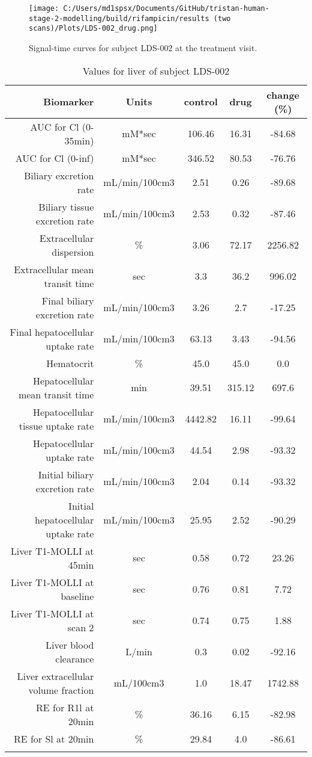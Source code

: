 \documentclass{epflreport}%
\begin{document}
%


\begin{figure}[h!]%
\centering%
\texttt{[image: C:/Users/md1spsx/Documents/GitHub/tristan-human-stage-2-modelling/build/rifampicin/results (two scans)/Plots/LDS-002\_drug.png]}%
\caption{Signal{-}time curves for subject LDS{-}002 at the treatment visit.}%
\end{figure}

%
\clearpage%
\begin{longtable}{rcccc}%
\hline%
Biomarker&Units&control&drug&change (\%)\\%
\hline%
AUC for Cl (0{-}35min)&mM*sec&106.46&16.31&{-}84.68\\%
AUC for Cl (0{-}inf)&mM*sec&346.52&80.53&{-}76.76\\%
Biliary excretion rate&mL/min/100cm3&2.51&0.26&{-}89.68\\%
Biliary tissue excretion rate&mL/min/100cm3&2.53&0.32&{-}87.46\\%
Extracellular dispersion&\%&3.06&72.17&2256.82\\%
Extracellular mean transit time&sec&3.3&36.2&996.02\\%
Final biliary excretion rate&mL/min/100cm3&3.26&2.7&{-}17.25\\%
Final hepatocellular uptake rate&mL/min/100cm3&63.13&3.43&{-}94.56\\%
Hematocrit&\%&45.0&45.0&0.0\\%
Hepatocellular mean transit time&min&39.51&315.12&697.6\\%
Hepatocellular tissue uptake rate&mL/min/100cm3&4442.82&16.11&{-}99.64\\%
Hepatocellular uptake rate&mL/min/100cm3&44.54&2.98&{-}93.32\\%
Initial biliary excretion rate&mL/min/100cm3&2.04&0.14&{-}93.32\\%
Initial hepatocellular uptake rate&mL/min/100cm3&25.95&2.52&{-}90.29\\%
Liver T1{-}MOLLI at 45min&sec&0.58&0.72&23.26\\%
Liver T1{-}MOLLI at baseline&sec&0.76&0.81&7.72\\%
Liver T1{-}MOLLI at scan 2&sec&0.74&0.75&1.88\\%
Liver blood clearance&L/min&0.3&0.02&{-}92.16\\%
Liver extracellular volume fraction&mL/100cm3&1.0&18.47&1742.88\\%
RE for R1l at 20min&\%&36.16&6.15&{-}82.98\\%
RE for Sl at 20min&\%&29.84&4.0&{-}86.61\\%
\hline%
\caption{Values for liver of subject LDS-002} \\%
\end{longtable}%
\end{document}
